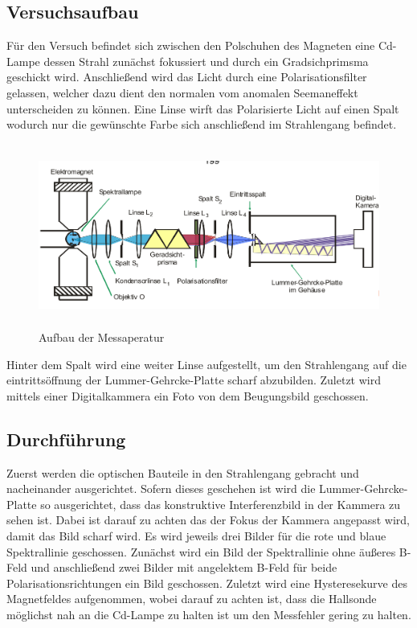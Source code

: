 \subsection{Versuchsaufbau}
Für den Versuch befindet sich zwischen den Polschuhen des Magneten eine Cd-Lampe dessen Strahl zunächst fokussiert und durch ein Gradsichprimsma geschickt wird. Anschließend wird das Licht durch eine Polarisationsfilter gelassen, welcher dazu dient den normalen vom anomalen Seemaneffekt unterscheiden zu können. Eine Linse wirft das Polarisierte Licht auf einen Spalt wodurch nur die gewünschte Farbe sich anschließend im Strahlengang befindet. 
\begin{figure}[H]
  \centering
  \includegraphics[height=6cm]{Bilder/Aufbau.png}
  \caption{Aufbau der Messaperatur \cite{V27}}
  \label{fig:<+label+>}
\end{figure}
Hinter dem Spalt wird eine weiter Linse aufgestellt, um den Strahlengang auf die eintrittsöffnung der Lummer-Gehrcke-Platte scharf abzubilden. Zuletzt wird mittels einer Digitalkammera ein Foto von dem Beugungsbild geschossen.

\subsection{Durchführung}
Zuerst werden die optischen Bauteile in den Strahlengang gebracht und nacheinander ausgerichtet. Sofern dieses geschehen ist wird die Lummer-Gehrcke-Platte so ausgerichtet, dass das konstruktive Interferenzbild in der Kammera zu sehen ist. Dabei ist darauf zu achten das der Fokus der Kammera angepasst wird, damit das Bild scharf wird. Es wird jeweils drei Bilder für die rote und blaue Spektrallinie geschossen. Zunächst wird ein Bild der Spektrallinie ohne äußeres B-Feld und anschließend zwei Bilder mit angelektem B-Feld für beide Polarisationsrichtungen ein Bild geschossen. Zuletzt wird eine Hysteresekurve des Magnetfeldes aufgenommen, wobei darauf zu achten ist, dass die Hallsonde möglichst nah an die Cd-Lampe zu halten ist um den Messfehler gering zu halten.

